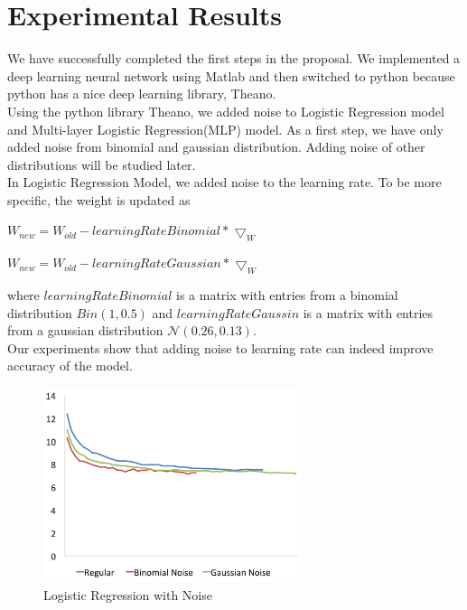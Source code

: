 \section{Experimental Results}
\label{sec:result}

We have successfully completed the first steps in the proposal.
We implemented a deep learning neural network using Matlab and then
switched to python because python has a nice deep learning library,
Theano.\\
Using the python library Theano, we added noise to Logistic Regression
model and Multi-layer Logistic Regression(MLP) model.
As a first step, we have only added noise from binomial and gaussian
distribution. Adding noise of other distributions will be studied later.\\
In Logistic Regression Model, we added noise to the learning rate.
To be more specific, the weight is updated as
\begin{center}
$W_{new} = W_{old} - learningRateBinomial * \bigtriangledown_{W}$
\end{center}
\begin{center}
$W_{new} = W_{old} - learningRateGaussian * \bigtriangledown_{W}$
\end{center}
where $learningRateBinomial$ is a matrix with entries from a binomial
distribution $Bin(1,0.5)$
and $learningRateGaussin$ is a matrix with entries from a gaussian
distribution $\mathcal{N}(0.26,0.13)$.\\
Our experiments show that adding noise to learning rate can indeed
improve accuracy of the model.
\begin{figure}
\caption{Logistic Regression with Noise}
\centering
\includegraphics[width=215pt]{figs/logistic_sgd_all.png}
\end{figure}
